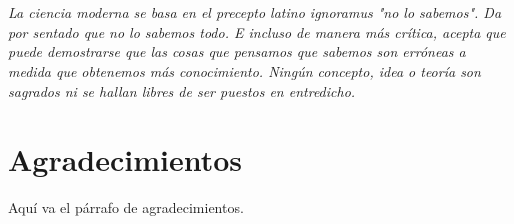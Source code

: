 
\chapter*{}

\vspace{15mm}


	
	\textit{La ciencia moderna se basa en el precepto latino ignoramus "no lo sabemos". Da por sentado que no lo sabemos todo. E incluso de manera más crítica, acepta que puede demostrarse que las cosas que pensamos que sabemos son erróneas a medida que obtenemos más conocimiento. Ningún concepto, idea o teoría son sagrados ni se hallan libres de ser puestos en entredicho. %
}

\vspace{5mm}

\begin{flushright}
	
\end{flushright}


\chapter*{Agradecimientos}

Aquí va el párrafo de agradecimientos.


